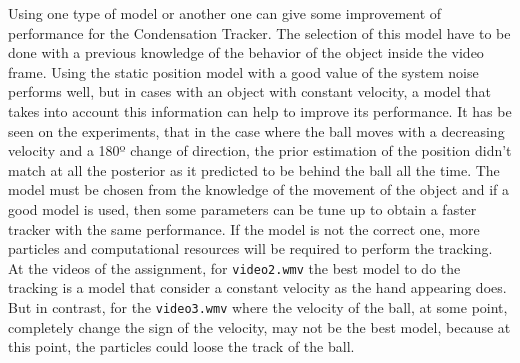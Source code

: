 \documentclass{ethz_report}
\begin{document}
Using one type of model or another one can give some improvement of performance for the Condensation Tracker. The selection of this model have to be done with a previous knowledge of the behavior of the object inside the video frame. Using the static position model with a good value of the system noise performs well, but in cases with an object with constant velocity, a model that takes into account this information can help to improve its performance.
It has be seen on the experiments, that in the case where the ball moves with a decreasing velocity and a 180º change of direction, the prior estimation of the position didn't match at all the posterior as it predicted to be behind the ball all the time.
The model must be chosen from the knowledge of the movement of the object and if a good model is used, then some parameters can be tune up to obtain a faster tracker with the same performance. If the model is not the correct one, more particles and computational resources will be required to perform the tracking.
At the videos of the assignment, for \texttt{video2.wmv} the best model to do the tracking is a model that consider a constant velocity as the hand appearing does. But in contrast, for the \texttt{video3.wmv} where the velocity of the ball, at some point, completely change the sign of the velocity, may not be the best model, because at this point, the particles could loose the track of the ball.
\end{document}

